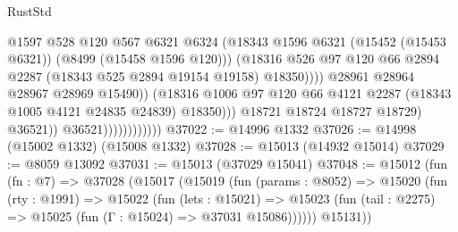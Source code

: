 \begin{lexlean}{RustStd}
\begin{coremodule}
                                                @1597
                                                @528
                                                @120
                                                @567
                                                @6321
                                                @6324
                                                (@18343
                                                  @1596
                                                  @6321
                                                  (@15452 (@15453 @6321))
                                                  (@8499 (@15458 @1596 @120)))
                                                (@18316
                                                  @526
                                                  @97
                                                  @120
                                                  @66
                                                  @2894
                                                  @2287
                                                  (@18343 @525 @2894 @19154 @19158)
                                                  @18350))))
                                          @28961
                                          @28964
                                          @28967
                                          @28969
                                          @15490))
                                      (@18316
                                        @1006
                                        @97
                                        @120
                                        @66
                                        @4121
                                        @2287
                                        (@18343 @1005 @4121 @24835 @24839)
                                        @18350)))
                                  @18721
                                  @18724
                                  @18727
                                  @18729)
                                @36521))
                            @36521))))))))))))
@37022 := @14996 @1332
@37026 := @14998 (@15002 @1332) (@15008 @1332)
@37028 := @15013 (@14932 @15014)
@37029 := @8059 @13092
@37031 := @15013 (@37029 @15041)
@37048 := @15012
    (fun (fn : @7) =>
    @37028
      (@15017
        (@15019
          (fun (params : @8052) =>
          @15020
            (fun (rty : @1991) =>
            @15022
              (fun (lets : @15021) =>
              @15023 (fun (tail : @2275) => @15025 (fun (Γ : @15024) => @37031 @15086))))))
        @15131))

\end{coremodule}
\end{lexlean}
